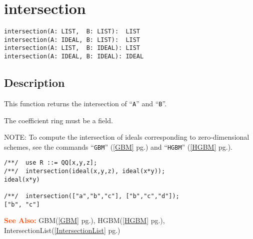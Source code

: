 \documentclass[a4paper]{mybook}
\newenvironment{command}{}{} %
\newcommand\SeeAlso{\par\textcolor{OrangeRed}{\textbf{\large See Also: }}}
\begin{document}
\section{intersection}
\label{intersection}
\begin{command} %


\begin{Verbatim}[label=syntax, rulecolor=\color{MidnightBlue},
frame=single]
intersection(A: LIST,  B: LIST):  LIST
intersection(A: IDEAL, B: LIST):  LIST
intersection(A: LIST,  B: IDEAL): LIST
intersection(A: IDEAL, B: IDEAL): IDEAL
\end{Verbatim}


\subsection*{Description}

This function returns the intersection of ``\verb&A&'' and ``\verb&B&''.
\par 
The coefficient ring must be a field.
\par 
NOTE: To compute the intersection of ideals corresponding to
zero-dimensional schemes, see the commands ``\verb&GBM&'' (\ref{GBM} pg.\pageref{GBM}) and ``\verb&HGBM&'' (\ref{HGBM} pg.\pageref{HGBM}).
\begin{Verbatim}[label=example, rulecolor=\color{PineGreen}, frame=single]
/**/  use R ::= QQ[x,y,z];
/**/  intersection(ideal(x,y,z), ideal(x*y));
ideal(x*y)

/**/  intersection(["a","b","c"], ["b","c","d"]);
["b", "c"]
\end{Verbatim}


\SeeAlso %
  GBM(\ref{GBM} pg.\pageref{GBM}), 
    HGBM(\ref{HGBM} pg.\pageref{HGBM}), 
    IntersectionList(\ref{IntersectionList} pg.\pageref{IntersectionList})
\end{command} %
\end{document}
